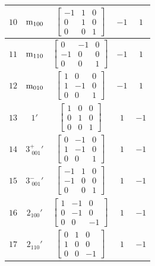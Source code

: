 \documentclass[fleqn,8pt]{jsarticle}
\begin{document}
\begin{longtable}{ccccc}
$ 10 $ & $ {\rm m}_{100} $ & $ \begin{bmatrix} -1 & 1 & 0 \\ 0 & 1 & 0 \\ 0 & 0 & 1 \end{bmatrix} $ & $ -1 $ & $ 1 $ \\ \hline
$ 11 $ & $ {\rm m}_{110} $ & $ \begin{bmatrix} 0 & -1 & 0 \\ -1 & 0 & 0 \\ 0 & 0 & 1 \end{bmatrix} $ & $ -1 $ & $ 1 $ \\ \hline
$ 12 $ & $ {\rm m}_{010} $ & $ \begin{bmatrix} 1 & 0 & 0 \\ 1 & -1 & 0 \\ 0 & 0 & 1 \end{bmatrix} $ & $ -1 $ & $ 1 $ \\ \hline
$ 13 $ & $ 1{}' $ & $ \begin{bmatrix} 1 & 0 & 0 \\ 0 & 1 & 0 \\ 0 & 0 & 1 \end{bmatrix} $ & $ 1 $ & $ -1 $ \\ \hline
$ 14 $ & $ 3^{+}_{\,\,001}{}' $ & $ \begin{bmatrix} 0 & -1 & 0 \\ 1 & -1 & 0 \\ 0 & 0 & 1 \end{bmatrix} $ & $ 1 $ & $ -1 $ \\ \hline
$ 15 $ & $ 3^{-}_{\,\,001}{}' $ & $ \begin{bmatrix} -1 & 1 & 0 \\ -1 & 0 & 0 \\ 0 & 0 & 1 \end{bmatrix} $ & $ 1 $ & $ -1 $ \\ \hline
$ 16 $ & $ 2{}_{100}{}' $ & $ \begin{bmatrix} 1 & -1 & 0 \\ 0 & -1 & 0 \\ 0 & 0 & -1 \end{bmatrix} $ & $ 1 $ & $ -1 $ \\ \hline
$ 17 $ & $ 2{}_{110}{}' $ & $ \begin{bmatrix} 0 & 1 & 0 \\ 1 & 0 & 0 \\ 0 & 0 & -1 \end{bmatrix} $ & $ 1 $ & $ -1 $ \\ \hline

\end{longtable}
\end{document}
